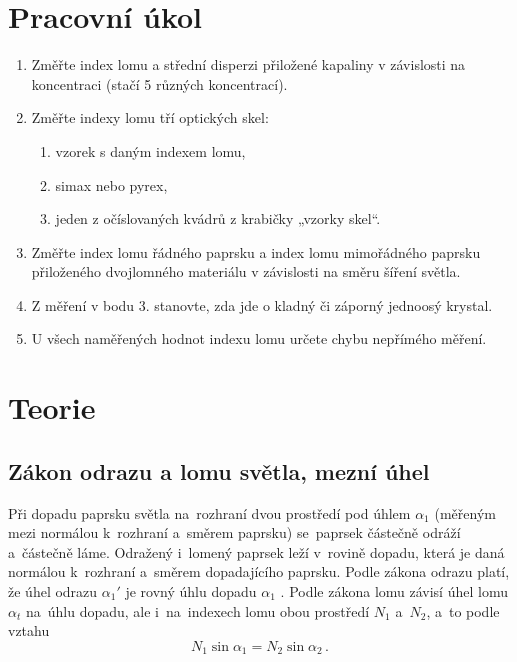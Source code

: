 \documentclass{../concepts/titul_protokol_p/prepareprotokol} %
\begin{document}
\renewcommand{\figurename}{Graf}
\renewcommand{\refname}{Literatura}
\renewcommand{\today}{\number\day.\,\number\month.\,\number\year}

\graphicspath{{../concepts/titul_protokol_p/}}
\maketitle

\section{Pracovní úkol}
\begin{enumerate}
    \item Změřte index lomu a střední disperzi přiložené kapaliny v závislosti na koncentraci (stačí 5 různých koncentrací).
    \item Změřte indexy lomu tří optických skel:
    \begin{enumerate}
        \item vzorek s daným indexem lomu,
        \item simax nebo pyrex,
        \item jeden z očíslovaných kvádrů z krabičky „vzorky skel“.
    \end{enumerate}
    \item Změřte index lomu řádného paprsku a index lomu mimořádného paprsku přiloženého dvojlomného materiálu v závislosti na směru šíření světla.
    \item Z měření v bodu 3. stanovte, zda jde o kladný či záporný jednoosý krystal.
    \item U všech naměřených hodnot indexu lomu určete chybu nepřímého měření.
\end{enumerate}

\section{Teorie}
\subsection{Zákon odrazu a lomu světla, mezní úhel}
Při dopadu paprsku světla na~rozhraní dvou prostředí pod úhlem $\alpha_1$ (měřeným mezi normálou k~rozhraní
a~směrem paprsku) se~paprsek částečně odráží a~částečně láme. Odražený i~lomený paprsek leží v~rovině dopadu,
která je daná normálou k~rozhraní a~směrem dopadajícího paprsku. Podle zákona odrazu platí, že úhel
odrazu $\alpha_1'$ je rovný úhlu dopadu $\alpha_1$ \cite{studijni}. Podle zákona lomu závisí úhel lomu
$\alpha_t$ na~úhlu dopadu, ale i~na~indexech lomu obou prostředí $N_1$ a~$N_2$, a~to podle vztahu \cite{studijni}
\begin{equation}
    \label{eq:snell}
    N_1 \sin \alpha_1 = N_2 \sin \alpha_2 \,.
\end{equation}
\end{document}
